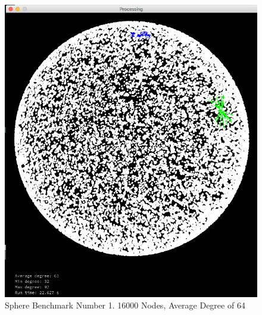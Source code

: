 \documentclass{article}
\begin{document}
\begin{center}
    \begin{figure}
        \includegraphics[scale=0.45]{./images/sphere_0.png}
        \caption{Sphere Benchmark Number 1. 16000 Nodes, Average Degree of 64}
        \label{sphere0}
    \end{figure}
\end{center}
\end{document}
